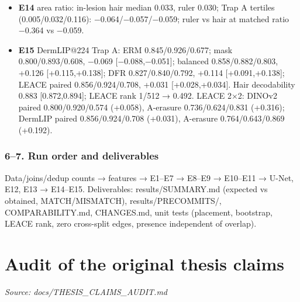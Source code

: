 {\begin{itemize}
  Trap A mask − ERM: HAM −0.030 {[}−0.059,−0.003{]}, BCN −0.078 {[}−0.099,−0.058{]}; Trap B without BCN +0.276;
  HAM paired mask-source check: −0.006 {[}−0.029,+0.016{]}.
\item
  \textbf{E14} area ratio: in-lesion hair median 0.033, ruler 0.030; Trap A tertiles (0.005/0.032/0.116):
  −0.064/−0.057/−0.059; ruler vs hair at matched ratio −0.364 vs −0.059.
\item
  \textbf{E15} DermLIP@224 Trap A: ERM 0.845/0.926/0.677; mask 0.800/0.893/0.608, −0.069 {[}−0.088,−0.051{]}; balanced
  0.858/0.882/0.803, +0.126 {[}+0.115,+0.138{]}; DFR 0.827/0.840/0.792, +0.114 {[}+0.091,+0.138{]}; LEACE paired
  0.856/0.924/0.708, +0.031 {[}+0.028,+0.034{]}. Hair decodability 0.883 {[}0.872,0.894{]}; LEACE rank 1/512 → 0.492.
  LEACE 2×2: DINOv2 paired 0.800/0.920/0.574 (+0.058), A-erasure 0.736/0.624/0.831 (+0.316); DermLIP paired
  0.856/0.924/0.708 (+0.031), A-erasure 0.764/0.643/0.869 (+0.192).
\end{itemize}

\subsubsection{6--7. Run order and deliverables}\label{67-run-order-and-deliverables}

Data/joins/dedup counts → features → E1--E7 → E8--E9 → E10--E11 → U-Net, E12, E13 → E14--E15.
Deliverables: results/SUMMARY.md (expected vs obtained, MATCH/MISMATCH), results/PRECOMMITS/, COMPARABILITY.md,
CHANGES.md, unit tests (placement, bootstrap, LEACE rank, zero cross-split edges, presence independent of overlap).

}

\section{Audit of the original thesis claims}\label{doc:THESIS_CLAIMS_AUDIT}
\noindent\textit{Source: docs/THESIS\_CLAIMS\_AUDIT.md}

